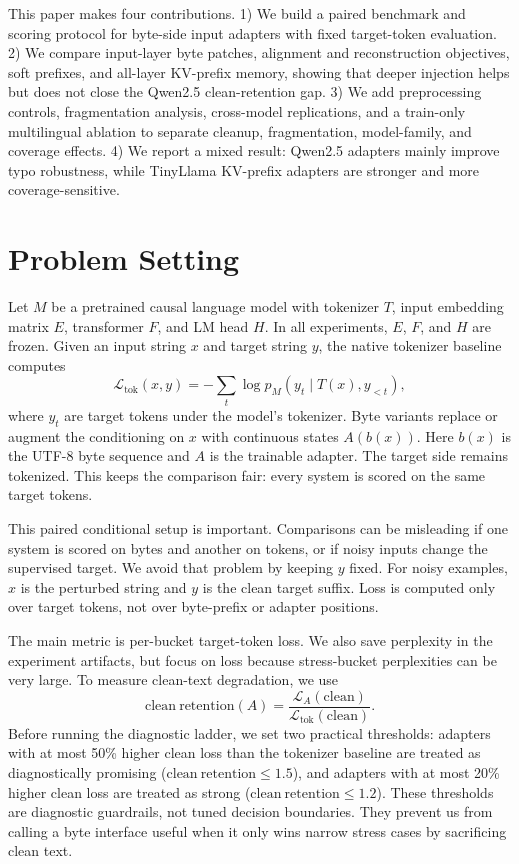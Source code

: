 \documentclass[runningheads]{llncs}
\newcommand{\loss}{\mathcal{L}}
\newcommand{\cratio}{\mathrm{clean\ retention}}
\begin{document}
This paper makes four contributions. 1) We build a paired benchmark and scoring protocol for byte-side input adapters with fixed target-token evaluation. 2) We compare input-layer byte patches, alignment and reconstruction objectives, soft prefixes, and all-layer KV-prefix memory, showing that deeper injection helps but does not close the Qwen2.5 clean-retention gap. 3) We add preprocessing controls, fragmentation analysis, cross-model replications, and a train-only multilingual ablation to separate cleanup, fragmentation, model-family, and coverage effects. 4) We report a mixed result: Qwen2.5 adapters mainly improve typo robustness, while TinyLlama KV-prefix adapters are stronger and more coverage-sensitive.

\section{Problem Setting}

Let $M$ be a pretrained causal language model with tokenizer $T$, input embedding matrix $E$, transformer $F$, and LM head $H$. In all experiments, $E$, $F$, and $H$ are frozen. Given an input string $x$ and target string $y$, the native tokenizer baseline computes
\begin{equation}
    \loss_{\mathrm{tok}}(x,y) = - \sum_t \log p_M(y_t \mid T(x), y_{<t}),
\end{equation}
where $y_t$ are target tokens under the model's tokenizer. Byte variants replace or augment the conditioning on $x$ with continuous states $A(b(x))$. Here $b(x)$ is the UTF-8 byte sequence and $A$ is the trainable adapter. The target side remains tokenized. This keeps the comparison fair: every system is scored on the same target tokens.

This paired conditional setup is important. Comparisons can be misleading if one system is scored on bytes and another on tokens, or if noisy inputs change the supervised target. We avoid that problem by keeping $y$ fixed. For noisy examples, $x$ is the perturbed string and $y$ is the clean target suffix. Loss is computed only over target tokens, not over byte-prefix or adapter positions.

The main metric is per-bucket target-token loss. We also save perplexity in the experiment artifacts, but focus on loss because stress-bucket perplexities can be very large. To measure clean-text degradation, we use
\begin{equation}
    \cratio(A) = \frac{\loss_A(\mathrm{clean})}{\loss_{\mathrm{tok}}(\mathrm{clean})}.
\end{equation}
Before running the diagnostic ladder, we set two practical thresholds: adapters with at most 50\% higher clean loss than the tokenizer baseline are treated as diagnostically promising ($\cratio \leq 1.5$), and adapters with at most 20\% higher clean loss are treated as strong ($\cratio \leq 1.2$). These thresholds are diagnostic guardrails, not tuned decision boundaries. They prevent us from calling a byte interface useful when it only wins narrow stress cases by sacrificing clean text.
\end{document}
